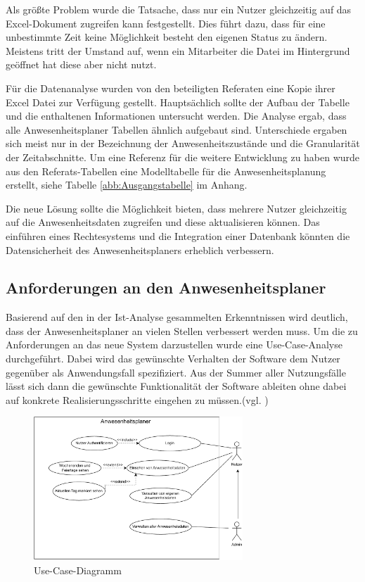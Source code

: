 Als größte Problem wurde die Tatsache, dass nur ein Nutzer gleichzeitig auf das Excel-Dokument zugreifen kann festgestellt. Dies führt dazu, dass für eine unbestimmte Zeit keine Möglichkeit besteht den eigenen Status zu ändern. Meistens tritt der Umstand auf, wenn ein Mitarbeiter die Datei im Hintergrund geöffnet hat diese aber nicht nutzt.

Für die Datenanalyse wurden von den beteiligten Referaten eine Kopie ihrer Excel Datei zur Verfügung gestellt. Hauptsächlich sollte der Aufbau der Tabelle und die enthaltenen Informationen untersucht werden. Die Analyse ergab, dass alle Anwesenheitsplaner Tabellen ähnlich aufgebaut sind. Unterschiede ergaben sich meist nur in der Bezeichnung der Anwesenheitszustände und die Granularität der Zeitabschnitte. Um eine Referenz für die weitere Entwicklung zu haben wurde aus den Referats-Tabellen eine Modelltabelle für die Anwesenheitsplanung erstellt, siehe Tabelle \ref{abb:Ausgangstabelle} im Anhang.

Die neue Lösung sollte die Möglichkeit bieten, dass mehrere Nutzer gleichzeitig auf die Anwesenheitsdaten zugreifen und diese aktualisieren können. Das einführen eines Rechtesystems und die Integration einer Datenbank könnten die Datensicherheit des Anwesenheitsplaners erheblich verbessern.

\subsection{Anforderungen an den Anwesenheitsplaner}
\label{sec:Soll-Zustand}
Basierend auf den in der Ist-Analyse gesammelten Erkenntnissen wird deutlich, dass der Anwesenheitsplaner an vielen Stellen verbessert werden muss. Um die zu Anforderungen an das neue System darzustellen wurde eine Use-Case-Analyse durchgeführt. Dabei wird das gewünschte Verhalten der Software dem Nutzer gegenüber als Anwendungsfall spezifiziert. Aus der Summer aller Nutzungsfälle lässt sich dann die gewünschte Funktionalität der Software ableiten ohne dabei auf konkrete Realisierungsschritte eingehen zu müssen.(vgl. \cite[S. 164]{neumann-2002})

\begin{figure}[htb]
    \centering
    \includegraphics[width=0.7\textwidth,angle=0]{abb/use-case-diagramm.pdf}
    \caption[Beschreibung]{Use-Case-Diagramm}
    \label{fig:Use-Case-Diagramm}
\end{figure}

